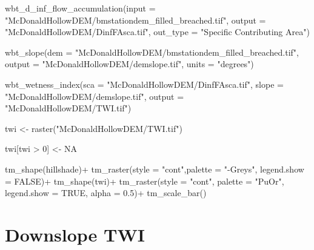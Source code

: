 \documentclass[
]{book}
\newenvironment{Shaded}{\begin{snugshade}}{\end{snugshade}}
\newcommand{\AttributeTok}[1]{\textcolor[rgb]{0.77,0.63,0.00}{#1}}
\newcommand{\ConstantTok}[1]{\textcolor[rgb]{0.00,0.00,0.00}{#1}}
\newcommand{\DecValTok}[1]{\textcolor[rgb]{0.00,0.00,0.81}{#1}}
\newcommand{\FloatTok}[1]{\textcolor[rgb]{0.00,0.00,0.81}{#1}}
\newcommand{\FunctionTok}[1]{\textcolor[rgb]{0.00,0.00,0.00}{#1}}
\newcommand{\NormalTok}[1]{#1}
\newcommand{\OtherTok}[1]{\textcolor[rgb]{0.56,0.35,0.01}{#1}}
\newcommand{\SpecialCharTok}[1]{\textcolor[rgb]{0.00,0.00,0.00}{#1}}
\newcommand{\StringTok}[1]{\textcolor[rgb]{0.31,0.60,0.02}{#1}}
\begin{document}
\begin{Shaded}
\begin{Highlighting}[]
\FunctionTok{wbt\_d\_inf\_flow\_accumulation}\NormalTok{(}\AttributeTok{input =} \StringTok{"McDonaldHollowDEM/bmstationdem\_filled\_breached.tif"}\NormalTok{,}
                            \AttributeTok{output =} \StringTok{"McDonaldHollowDEM/DinfFAsca.tif"}\NormalTok{,}
                            \AttributeTok{out\_type =} \StringTok{"Specific Contributing Area"}\NormalTok{)}

\FunctionTok{wbt\_slope}\NormalTok{(}\AttributeTok{dem =} \StringTok{"McDonaldHollowDEM/bmstationdem\_filled\_breached.tif"}\NormalTok{,}
          \AttributeTok{output =} \StringTok{"McDonaldHollowDEM/demslope.tif"}\NormalTok{,}
          \AttributeTok{units =} \StringTok{"degrees"}\NormalTok{)}

\FunctionTok{wbt\_wetness\_index}\NormalTok{(}\AttributeTok{sca =} \StringTok{"McDonaldHollowDEM/DinfFAsca.tif"}\NormalTok{,}
                  \AttributeTok{slope =} \StringTok{"McDonaldHollowDEM/demslope.tif"}\NormalTok{,}
                  \AttributeTok{output =} \StringTok{"McDonaldHollowDEM/TWI.tif"}\NormalTok{)}

\NormalTok{twi }\OtherTok{\textless{}{-}} \FunctionTok{raster}\NormalTok{(}\StringTok{"McDonaldHollowDEM/TWI.tif"}\NormalTok{)}

\NormalTok{twi[twi }\SpecialCharTok{\textgreater{}} \DecValTok{0}\NormalTok{] }\OtherTok{\textless{}{-}} \ConstantTok{NA}

\FunctionTok{tm\_shape}\NormalTok{(hillshade)}\SpecialCharTok{+}
  \FunctionTok{tm\_raster}\NormalTok{(}\AttributeTok{style =} \StringTok{"cont"}\NormalTok{,}\AttributeTok{palette =} \StringTok{"{-}Greys"}\NormalTok{, }\AttributeTok{legend.show =} \ConstantTok{FALSE}\NormalTok{)}\SpecialCharTok{+}
\FunctionTok{tm\_shape}\NormalTok{(twi)}\SpecialCharTok{+}
  \FunctionTok{tm\_raster}\NormalTok{(}\AttributeTok{style =} \StringTok{"cont"}\NormalTok{, }\AttributeTok{palette =} \StringTok{"PuOr"}\NormalTok{, }\AttributeTok{legend.show =} \ConstantTok{TRUE}\NormalTok{, }\AttributeTok{alpha =} \FloatTok{0.5}\NormalTok{)}\SpecialCharTok{+}
  \FunctionTok{tm\_scale\_bar}\NormalTok{()}
\end{Highlighting}
\end{Shaded}

\hypertarget{downslope-twi}{%
\section{Downslope TWI}\label{downslope-twi}}
\end{document}
